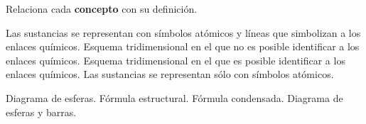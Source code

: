 Relaciona cada \textbf{concepto} con su definición.

\begin{minipage}[t]{0.5\textwidth}
    \begin{choices}
        \choice Las sustancias se representan con símbolos atómicos y líneas que simbolizan a los enlaces químicos.
        \choice Esquema tridimensional en el que no es posible identificar a los enlaces químicos.
        \choice Esquema tridimensional en el que es posible identificar a los enlaces químicos.
        \choice Las sustancias se representan sólo con símbolos atómicos.
    \end{choices}
\end{minipage}\hfill
\begin{minipage}[t]{0.4\textwidth}
    \begin{parts}
        \fillin[][1cm] Diagrama de esferas.
        \fillin[][1cm] Fórmula estructural.
        \fillin[][1cm] Fórmula condensada.
        \fillin[][1cm] Diagrama de esferas y barras.
    \end{parts}
\end{minipage}
